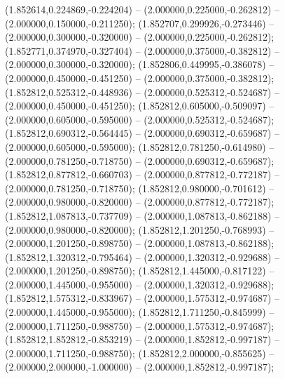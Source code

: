  (1.852614,0.224869,-0.224204) -- (2.000000,0.225000,-0.262812) -- (2.000000,0.150000,-0.211250);
 (1.852707,0.299926,-0.273446) -- (2.000000,0.300000,-0.320000) -- (2.000000,0.225000,-0.262812);
 (1.852771,0.374970,-0.327404) -- (2.000000,0.375000,-0.382812) -- (2.000000,0.300000,-0.320000);
 (1.852806,0.449995,-0.386078) -- (2.000000,0.450000,-0.451250) -- (2.000000,0.375000,-0.382812);
 (1.852812,0.525312,-0.448936) -- (2.000000,0.525312,-0.524687) -- (2.000000,0.450000,-0.451250);
 (1.852812,0.605000,-0.509097) -- (2.000000,0.605000,-0.595000) -- (2.000000,0.525312,-0.524687);
 (1.852812,0.690312,-0.564445) -- (2.000000,0.690312,-0.659687) -- (2.000000,0.605000,-0.595000);
 (1.852812,0.781250,-0.614980) -- (2.000000,0.781250,-0.718750) -- (2.000000,0.690312,-0.659687);
 (1.852812,0.877812,-0.660703) -- (2.000000,0.877812,-0.772187) -- (2.000000,0.781250,-0.718750);
 (1.852812,0.980000,-0.701612) -- (2.000000,0.980000,-0.820000) -- (2.000000,0.877812,-0.772187);
 (1.852812,1.087813,-0.737709) -- (2.000000,1.087813,-0.862188) -- (2.000000,0.980000,-0.820000);
 (1.852812,1.201250,-0.768993) -- (2.000000,1.201250,-0.898750) -- (2.000000,1.087813,-0.862188);
 (1.852812,1.320312,-0.795464) -- (2.000000,1.320312,-0.929688) -- (2.000000,1.201250,-0.898750);
 (1.852812,1.445000,-0.817122) -- (2.000000,1.445000,-0.955000) -- (2.000000,1.320312,-0.929688);
 (1.852812,1.575312,-0.833967) -- (2.000000,1.575312,-0.974687) -- (2.000000,1.445000,-0.955000);
 (1.852812,1.711250,-0.845999) -- (2.000000,1.711250,-0.988750) -- (2.000000,1.575312,-0.974687);
 (1.852812,1.852812,-0.853219) -- (2.000000,1.852812,-0.997187) -- (2.000000,1.711250,-0.988750);
 (1.852812,2.000000,-0.855625) -- (2.000000,2.000000,-1.000000) -- (2.000000,1.852812,-0.997187);
